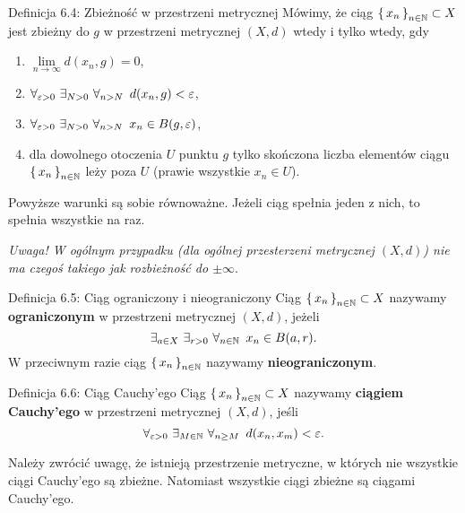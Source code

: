 \documentclass{article}
\newcommand{\hquad}{\mkern9mu}
\newcommand{\N}{\mathbb{N}}
\newcommand{\lin}[1]{\lim\limits_{n\to\infty}{#1}}
\newcommand{\seq}[1]{\set{#1_n}_{n\in\N}}
\begin{document}
\begin{defr}{Definicja 6.4: Zbieżność w przestrzeni metrycznej}
    Mówimy, że ciąg $\seq{x}\subset X$ jest zbieżny do $g$ w przestrzeni metrycznej $(X,d)$ wtedy i tylko wtedy, gdy
    \begin{enumerate}[label=(\arabic*)]
        \item $\lin{d(x_n,g)}=0$,
        \item $\forall_{\varepsilon>0}\ \exists_{N>0}\ \forall_{n>N}\hquad d(x_n,g)<\varepsilon$,
        \item $\forall_{\varepsilon>0}\ \exists_{N>0}\ \forall_{n>N}\hquad x_n\in B(g,\varepsilon)$,
        \item dla dowolnego otoczenia $U$ punktu $g$ tylko skończona liczba elementów ciągu $\seq{x}$
        leży poza $U$ (prawie wszystkie $x_n\in U$).
    \end{enumerate}
\end{defr}

Powyższe warunki są sobie równoważne. Jeżeli ciąg spełnia jeden z nich, to spełnia wszystkie na raz.\smallskip

\textit{Uwaga! W ogólnym przypadku (dla ogólnej przesterzeni metrycznej $(X,d)$) nie ma czegoś
takiego jak rozbieżność do $\pm\infty$}.

\begin{defr}{Definicja 6.5: Ciąg ograniczony i nieograniczony}
    Ciąg $\seq{x}\subset X$ nazywamy \textbf{ograniczonym} w przestrzeni metrycznej $(X,d)$, jeżeli
    \begin{equation*}
        \exists_{a\in X}\ \exists_{r>0}\ \forall_{n\in\N}\hquad x_n\in B(a,r).
    \end{equation*}
    W przeciwnym razie ciąg $\seq{x}$ nazywamy \textbf{nieograniczonym}.
\end{defr}

\begin{defr}{Definicja 6.6: Ciąg Cauchy'ego}
    Ciąg $\seq{x}\subset X$ nazywamy \textbf{ciągiem Cauchy'ego} w przestrzeni metrycznej $(X,d)$, jeśli
    \begin{equation*}
        \forall_{\varepsilon>0}\ \exists_{M\in\N}\ \forall_{n\ge M}\hquad d(x_n,x_m)<\varepsilon.
    \end{equation*}
\end{defr}

Należy zwrócić uwagę, że istnieją przestrzenie metryczne, w których nie wszystkie ciągi Cauchy'ego są zbieżne. Natomiast
wszystkie ciągi zbieżne są ciągami Cauchy'ego.
\end{document}
